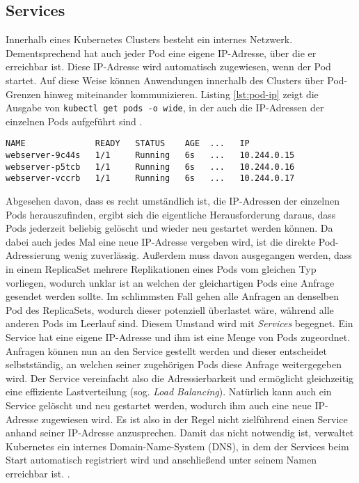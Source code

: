 \documentclass[11pt,a4paper]{article}
\begin{document}
\subsection{Services}
Innerhalb eines Kubernetes Clusters besteht ein internes Netzwerk. Dementsprechend hat auch jeder Pod
eine eigene IP-Adresse, über die er erreichbar ist. Diese IP-Adresse wird automatisch zugewiesen, wenn der Pod startet.
Auf diese Weise können Anwendungen innerhalb des Clusters über Pod-Grenzen hinweg miteinander kommunizieren.
Listing \ref{lst:pod-ip} zeigt die Ausgabe von \lstinline|kubectl get pods -o wide|, in der auch die IP-Adressen
der einzelnen Pods aufgeführt sind \cite{Schmeling_Dargatz_2022}.
\begin{lstlisting}[caption={\lstinline|kubectl get pods -o wide| veranschautlicht, dass jeder Pod seine eigene IP-Adresse erhält. Die Ausgabe wurde zur besseren Lesbarkeit gekürzt.}, label={lst:pod-ip}]
NAME              READY   STATUS    AGE  ...   IP           
webserver-9c44s   1/1     Running   6s   ...   10.244.0.15
webserver-p5tcb   1/1     Running   6s   ...   10.244.0.16
webserver-vccrb   1/1     Running   6s   ...   10.244.0.17
\end{lstlisting}

Abgesehen davon, dass es recht umständlich ist, die IP-Adressen der einzelnen Pods herauszufinden,
ergibt sich die eigentliche Herausforderung daraus, dass Pods jederzeit beliebig gelöscht
und wieder neu gestartet werden können. Da dabei auch jedes Mal eine neue IP-Adresse vergeben wird,
ist die direkte Pod-Adressierung wenig zuverlässig. Außerdem muss davon ausgegangen werden, dass
in einem ReplicaSet mehrere Replikationen eines Pods vom gleichen Typ vorliegen, wodurch unklar ist
an welchen der gleichartigen Pods eine Anfrage gesendet werden sollte. Im schlimmsten Fall gehen alle Anfragen
an denselben Pod des ReplicaSets, wodurch dieser potenziell überlastet wäre, während alle anderen Pods im Leerlauf sind.
Diesem Umstand wird mit \emph{Services} begegnet. Ein Service hat eine eigene IP-Adresse und ihm ist eine Menge
von Pods zugeordnet. Anfragen können nun an den Service gestellt werden und dieser entscheidet selbstständig,
an welchen seiner zugehörigen Pods diese Anfrage weitergegeben wird. Der Service vereinfacht also die
Adressierbarkeit und ermöglicht gleichzeitig eine effiziente Lastverteilung (sog. \emph{Load Balancing}).
Natürlich kann auch ein Service gelöscht und neu gestartet werden, wodurch ihm auch eine neue IP-Adresse zugewiesen wird.
Es ist also in der Regel nicht zielführend einen Service anhand seiner IP-Adresse anzusprechen.
Damit das nicht notwendig ist, verwaltet Kubernetes ein internes Domain-Name-System (DNS), in dem
der Services beim Start automatisch registriert wird und anschließend unter seinem Namen
erreichbar ist. \cite{Schmeling_Dargatz_2022}.
\end{document}
